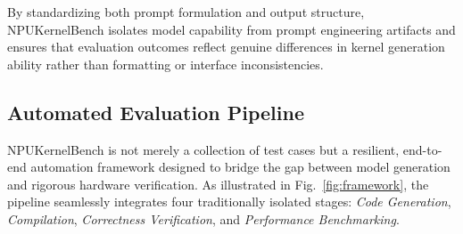 
By standardizing both prompt formulation and output structure, NPUKernelBench isolates model capability from prompt engineering artifacts and ensures that evaluation outcomes reflect genuine differences in kernel generation ability rather than formatting or interface inconsistencies.

\subsection{Automated Evaluation Pipeline}

NPUKernelBench is not merely a collection of test cases but a resilient, end-to-end automation framework designed to bridge the gap between model generation and rigorous hardware verification. As illustrated in Fig.~\ref{fig:framework}, the pipeline seamlessly integrates four traditionally isolated stages: \textit{Code Generation}, \textit{Compilation}, \textit{Correctness Verification}, and \textit{Performance Benchmarking}.

